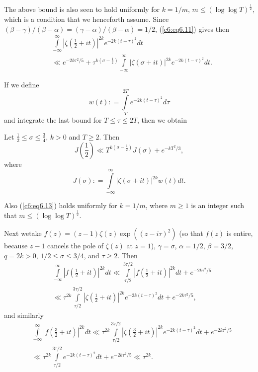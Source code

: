 The above bound is also seen to hold uniformly for $k=1/m$, $m \leq
(\log \log T)^{\frac{1}{2}}$, which is a condition that we henceforth
assume. Since $(\beta -\gamma) / (\beta - \alpha) = (\gamma - \alpha)
/ (\beta - \alpha) = 1/2$, (\ref{c6:eq6.11}) gives then 
\begin{align*}
& \int\limits^\infty_{-\infty} \left|\zeta \left(\frac{1}{2} + it
  \right)\right|^{2k} e^{-2k(t-\tau)^2} dt\\ 
& \ll e^{-2k\tau^2/5} + \tau^{k(\sigma -\frac{1}{2})}
  \int\limits^{\infty}_{-\infty} |\zeta(\sigma + it)|^{2k}
  e^{-2k(t-\tau)^2} dt. 
\end{align*}

If we define 
$$
w(t) : = \int\limits^{2T}_T e^{-2k(t-\tau)^2} d\tau
$$
and integrate the last bound for $T \leq \tau \leq 2T$, then we obtain 

\begin{lemma}\label{c6:lem6.4}
Let $\frac{1}{2} \leq \sigma \leq \frac{3}{4}$, $k > 0$ and $T \geq
2$. Then 
\begin{equation}
J \left(\frac{1}{2} \right) \ll T^{k(\sigma -\frac{1}{2})} J(\sigma) +
e^{-k T^2/3}, \label{c6:eq6.13}
\end{equation}
where
$$
J(\sigma): = \int\limits^\infty_{-\infty} |\zeta(\sigma + it)|^{2k}
w(t) dt. 
$$

Also (\ref{c6:eq6.13}) holds uniformly for $k = 1/m$, where $m\geq 1$
is an integer such that $m \leq (\log \log T)^{\frac{1}{2}}$. 
\end{lemma}

Next we\pageoriginale take $f(z) = (z-1) \zeta(z) \exp ((z-i\tau)^2)$
(so that $f(z)$ is entire, because $z-1$ cancels the pole of
$\zeta(z)$ at $z =1$), $\gamma =\sigma$, $\alpha = 1/2$, $\beta =
3/2$, $q = 2k > 0$, $1/2 \leq \sigma \leq 3/4$, and $\tau \geq
2$. Then 
\begin{align*}
& \int\limits^\infty_{-\infty} \left| f \left(\frac{1}{2} + it
  \right)\right|^{2k} dt \ll \int\limits^{3 \tau /2}_{\tau/2} \left|f
  \left(\frac{1}{2} + it \right)\right|^{2k} dt + e^{-2k\tau^2 /5}\\ 
& \ll \tau^{2k} \int\limits^{3\tau/2}_{\tau/2} 
\left|\zeta \left(\frac{1}{2} + it \right)\right|^{2k} 
e^{-2k (t-\tau)^2} dt + e^{-2k \tau^2/5},
\end{align*}
and similarly
\begin{align*}
& \int\limits^\infty_{-\infty} \left| f \left(\frac{3}{2} + it
  \right)\right|^{2k} dt \ll \tau^{2k} \int\limits^{3\tau/2}_{\tau/2}
  \left|\zeta \left(\frac{3}{2} + it \right)\right|^{2k} e^{-2k
    (t-\tau)^2} dt + e^{-2k\tau^2/5}\\ 
& \ll \tau^{2k} \int\limits^{3\tau /2}_{\tau/2} e^{-2k (t-\tau)^2} dt
  + e^{-2k\tau^2 /5} \ll \tau^{2k}. 
\end{align*}

